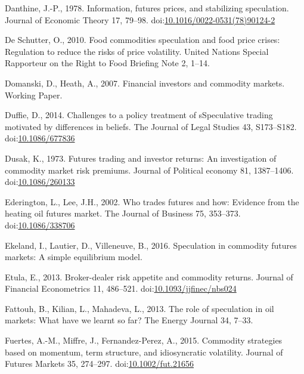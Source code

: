 \documentclass[]{elsarticle} %
\begin{document}
\leavevmode\hypertarget{ref-danthine_information_1978}{}%
Danthine, J.-P., 1978. Information, futures prices, and stabilizing
speculation. Journal of Economic Theory 17, 79--98.
doi:\href{https://doi.org/10.1016/0022-0531(78)90124-2}{10.1016/0022-0531(78)90124-2}

\leavevmode\hypertarget{ref-deschutter_food_2010}{}%
De Schutter, O., 2010. Food commodities speculation and food price
crises: Regulation to reduce the risks of price volatility. United
Nations Special Rapporteur on the Right to Food Briefing Note 2, 1--14.

\leavevmode\hypertarget{ref-domanski_financial_2007}{}%
Domanski, D., Heath, A., 2007. Financial investors and commodity
markets. Working Paper.

\leavevmode\hypertarget{ref-duffie_challenges_2014}{}%
Duffie, D., 2014. Challenges to a policy treatment of sSpeculative
trading motivated by differences in beliefs. The Journal of Legal
Studies 43, S173--S182.
doi:\href{https://doi.org/10.1086/677836}{10.1086/677836}

\leavevmode\hypertarget{ref-dusak_futures_1973}{}%
Dusak, K., 1973. Futures trading and investor returns: An investigation
of commodity market risk premiums. Journal of Political economy 81,
1387--1406. doi:\href{https://doi.org/10.1086/260133}{10.1086/260133}

\leavevmode\hypertarget{ref-ederington_who_2002}{}%
Ederington, L., Lee, J.H., 2002. Who trades futures and how: Evidence
from the heating oil futures market. The Journal of Business 75,
353--373. doi:\href{https://doi.org/10.1086/338706}{10.1086/338706}

\leavevmode\hypertarget{ref-ekeland_speculation_2016}{}%
Ekeland, I., Lautier, D., Villeneuve, B., 2016. Speculation in commodity
futures markets: A simple equilibrium model.

\leavevmode\hypertarget{ref-etula_broker-dealer_2013}{}%
Etula, E., 2013. Broker-dealer risk appetite and commodity returns.
Journal of Financial Econometrics 11, 486--521.
doi:\href{https://doi.org/10.1093/jjfinec/nbs024}{10.1093/jjfinec/nbs024}

\leavevmode\hypertarget{ref-fattouh_role_2013}{}%
Fattouh, B., Kilian, L., Mahadeva, L., 2013. The role of speculation in
oil markets: What have we learnt so far? The Energy Journal 34, 7--33.

\leavevmode\hypertarget{ref-fuertes_commodity_2015}{}%
Fuertes, A.-M., Miffre, J., Fernandez-Perez, A., 2015. Commodity
strategies based on momentum, term structure, and idiosyncratic
volatility. Journal of Futures Markets 35, 274--297.
doi:\href{https://doi.org/10.1002/fut.21656}{10.1002/fut.21656}
\end{document}

